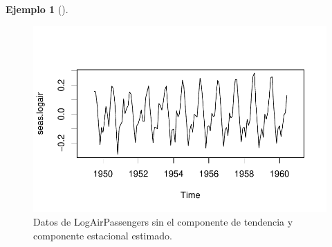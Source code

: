\documentclass[
  us-letterpaper,
]{scrreprt}
\theoremstyle{plain}
\theoremstyle{definition}
\theoremstyle{definition}
\newtheorem{example}{Ejemplo}[chapter]
\theoremstyle{plain}
\theoremstyle{remark}
\begin{document}
\begin{example}[]
\begin{tcolorbox}
\begin{figure}[H]
\begin{minipage}{0.50\linewidth}
{\includegraphics{series_files/figure-pdf/fig-seasairp-1.pdf}

}


\end{minipage}%
%
\begin{minipage}{0.50\linewidth}



\end{minipage}%

\caption{\label{fig-seasairp}Datos de LogAirPassengers sin el componente
de tendencia y componente estacional estimado.}

\end{figure}%


\end{tcolorbox}
\end{example}
\end{document}
